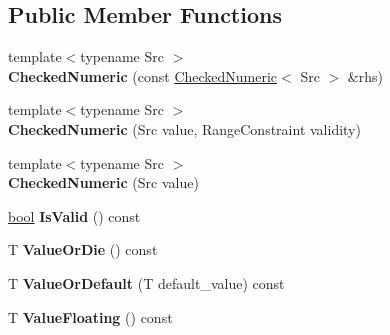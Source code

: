 \subsection*{Public Member Functions}
\begin{DoxyCompactItemize}
\item 
\mbox{\label{classv8_1_1base_1_1internal_1_1CheckedNumeric_acb1daa3773742023407941030fc37444}} 
{\footnotesize template$<$typename Src $>$ }\\{\bfseries Checked\+Numeric} (const \mbox{\hyperlink{classv8_1_1base_1_1internal_1_1CheckedNumeric}{Checked\+Numeric}}$<$ Src $>$ \&rhs)
\item 
\mbox{\label{classv8_1_1base_1_1internal_1_1CheckedNumeric_a56780ab8a1b1471f8ffa686b4298ba57}} 
{\footnotesize template$<$typename Src $>$ }\\{\bfseries Checked\+Numeric} (Src value, Range\+Constraint validity)
\item 
\mbox{\label{classv8_1_1base_1_1internal_1_1CheckedNumeric_afbc3fbba30b10b94b648a7ada32ec5c2}} 
{\footnotesize template$<$typename Src $>$ }\\{\bfseries Checked\+Numeric} (Src value)
\item 
\mbox{\label{classv8_1_1base_1_1internal_1_1CheckedNumeric_ae5309f341e95fa28acc1d4a1e38b82f8}} 
\mbox{\hyperlink{classbool}{bool}} {\bfseries Is\+Valid} () const
\item 
\mbox{\label{classv8_1_1base_1_1internal_1_1CheckedNumeric_ac03dff21943e7fd5678168eab83125cf}} 
T {\bfseries Value\+Or\+Die} () const
\item 
\mbox{\label{classv8_1_1base_1_1internal_1_1CheckedNumeric_a9aa781da72b3403999500feb70fadd3e}} 
T {\bfseries Value\+Or\+Default} (T default\+\_\+value) const
\item 
\mbox{\label{classv8_1_1base_1_1internal_1_1CheckedNumeric_a5f55dd0c755dd931d0c8108f3467be57}} 
T {\bfseries Value\+Floating} () const

\end{DoxyCompactItemize}
